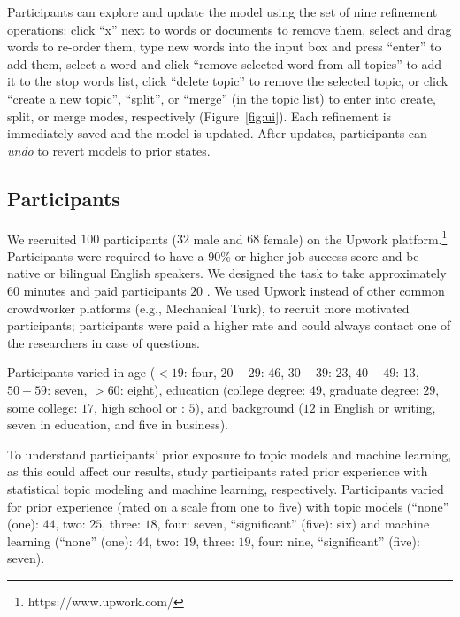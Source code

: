 Participants can explore and update the model using the set of nine
refinement operations:
click ``x'' next to words or documents to remove them, select and drag
words to re-order them, type new words into the input box and press
``enter'' to add them, select a word and click ``remove selected word
from all topics'' to add it to the stop words list, click ``delete
topic'' to remove the selected topic, or click ``create a new topic'',
``split'', or ``merge'' (in the topic list) to enter into create,
split, or merge modes, respectively (Figure~\ref{fig:ui}).
Each refinement is immediately saved and the model is updated. After
updates, participants can \textit{undo} to revert models to prior states.

\subsection{Participants}
We recruited $100$ participants ($32$ male and $68$ female) on the
Upwork platform.\footnote{https://www.upwork.com/} Participants were
  required to have a 90\% or higher job success score and be native or
  bilingual English speakers. 
  We designed the task to take approximately 60 minutes and paid participants $20$ . We used Upwork instead of other common crowdworker platforms (e.g., Mechanical Turk), to recruit more motivated participants; participants were paid a higher rate and could always contact one of the researchers in case of questions. 
  
Participants varied in age ($<19$: four, $20-29$: $46$, $30-39$: $23$,
$40-49$: $13$, $50-59$: seven, $>60$: eight), education (college
degree: $49$, graduate degree: $29$, some college: $17$, high school
or : $5$), and background ($12$ in English or writing, seven
in education, and five in business).

To understand participants' prior exposure to topic models and machine learning, as this could affect our results, study participants rated prior experience with statistical topic modeling and machine learning, respectively.
Participants varied for prior
experience (rated on a scale from one to five) with topic models (``none'' (one): $44$, two: $25$, three: $18$, four: seven, ``significant'' (five): six) and machine learning (``none'' (one): $44$, two: $19$, three: $19$, four: nine, ``significant'' (five): seven). 

